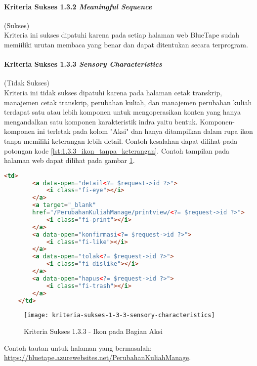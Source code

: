 \paragraph{Kriteria Sukses 1.3.2 \textit{Meaningful Sequence}}
\label{par:kepatuhan_bluetape_kriteria_sukses_1.3.2}
(Sukses)\\

Kriteria ini sukses dipatuhi karena pada setiap halaman web BlueTape sudah memiiliki urutan membaca yang benar dan dapat ditentukan secara terprogram. 

\paragraph{Kriteria Sukses 1.3.3 \textit{Sensory Characteristics}}
\label{par:kepatuhan_bluetape_kriteria_sukses_1.3.3}
(Tidak Sukses)\\

Kriteria ini tidak sukses dipatuhi karena pada halaman cetak transkrip, manajemen cetak transkrip, perubahan kuliah, dan manajemen perubahan kuliah terdapat satu atau lebih komponen untuk mengoperasikan konten yang hanya mengandalkan satu komponen karakteristik indra yaitu bentuk. Komponen-komponen ini terletak pada kolom "Aksi" dan hanya ditampilkan dalam rupa ikon tanpa memiliki keterangan lebih detail. Contoh kesalahan dapat dilihat pada potongan kode \ref{lst:1.3.3_ikon_tanpa_keterangan}. Contoh tampilan pada halaman web dapat dilihat pada gambar \ref{fig:1.3.3_sensory_characteristics}.

\begin{lstlisting}[frame=single, label={lst:1.3.3_ikon_tanpa_keterangan}, language=HTML, caption=Kriteria Sukses 1.3.3 - Ikon Tanpa Keterangan]
    <td>
        <a data-open="detail<?= $request->id ?>">
            <i class="fi-eye"></i>
        </a>
        <a target="_blank" 
        href="/PerubahanKuliahManage/printview/<?= $request->id ?>">
            <i class="fi-print"></i>
        </a>
        <a data-open="konfirmasi<?= $request->id ?>">
            <i class="fi-like"></i>
        </a>  
        <a data-open="tolak<?= $request->id ?>">
            <i class="fi-dislike"></i>
        </a>
        <a data-open="hapus<?= $request->id ?>">
            <i class="fi-trash"></i>
        </a>
    </td>
\end{lstlisting}

\begin{figure}[H]
	\centering  
	\texttt{[image: kriteria-sukses-1-3-3-sensory-characteristics]}  
    \caption[Kriteria Sukses 1.3.3 - Ikon pada Bagian Aksi]{Kriteria Sukses 1.3.3 - Ikon pada Bagian Aksi}
    \label{fig:1.3.3_sensory_characteristics}  
\end{figure} 
Contoh tautan untuk halaman yang bermasalah: \url{https://bluetape.azurewebsites.net/PerubahanKuliahManage}.

